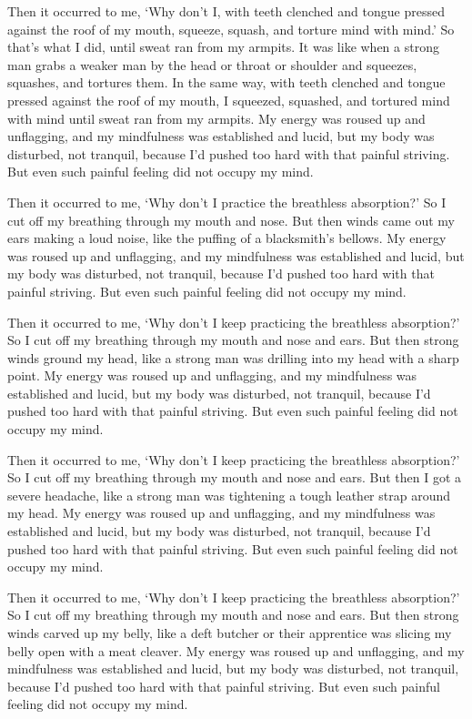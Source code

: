 \documentclass[12pt,openany]{book}%
\begin{document}
Then it occurred to me, ‘Why don’t I, with teeth clenched and tongue pressed against the roof of my mouth, squeeze, squash, and torture mind with mind.’ So that’s what I did, until sweat ran from my armpits. It was like when a strong man grabs a weaker man by the head or throat or shoulder and squeezes, squashes, and tortures them. In the same way, with teeth clenched and tongue pressed against the roof of my mouth, I squeezed, squashed, and tortured mind with mind until sweat ran from my armpits. My energy was roused up and unflagging, and my mindfulness was established and lucid, but my body was disturbed, not tranquil, because I’d pushed too hard with that painful striving. But even such painful feeling did not occupy my mind. 

Then it occurred to me, ‘Why don’t I practice the breathless absorption?’ So I cut off my breathing through my mouth and nose. But then winds came out my ears making a loud noise, like the puffing of a blacksmith’s bellows. My energy was roused up and unflagging, and my mindfulness was established and lucid, but my body was disturbed, not tranquil, because I’d pushed too hard with that painful striving. But even such painful feeling did not occupy my mind. 

Then it occurred to me, ‘Why don’t I keep practicing the breathless absorption?’ So I cut off my breathing through my mouth and nose and ears. But then strong winds ground my head, like a strong man was drilling into my head with a sharp point. My energy was roused up and unflagging, and my mindfulness was established and lucid, but my body was disturbed, not tranquil, because I’d pushed too hard with that painful striving. But even such painful feeling did not occupy my mind. 

Then it occurred to me, ‘Why don’t I keep practicing the breathless absorption?’ So I cut off my breathing through my mouth and nose and ears. But then I got a severe headache, like a strong man was tightening a tough leather strap around my head. My energy was roused up and unflagging, and my mindfulness was established and lucid, but my body was disturbed, not tranquil, because I’d pushed too hard with that painful striving. But even such painful feeling did not occupy my mind. 

Then it occurred to me, ‘Why don’t I keep practicing the breathless absorption?’ So I cut off my breathing through my mouth and nose and ears. But then strong winds carved up my belly, like a deft butcher or their apprentice was slicing my belly open with a meat cleaver. My energy was roused up and unflagging, and my mindfulness was established and lucid, but my body was disturbed, not tranquil, because I’d pushed too hard with that painful striving. But even such painful feeling did not occupy my mind. 
\end{document}
